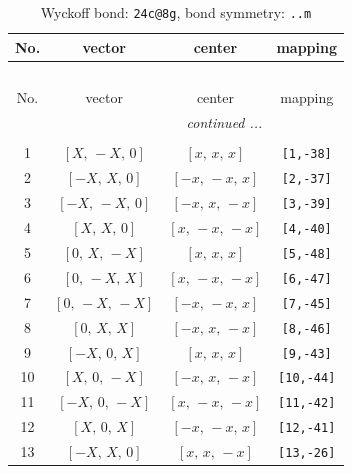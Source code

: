 \documentclass[fleqn,8pt]{jsarticle}
\begin{document}
\begin{longtable}{cccc}
\caption{Wyckoff bond: {\tt 24c@8g}, bond symmetry: {\tt ..m}}
 \\
 \hline \hline
No. & vector & center & mapping \\ \hline \endfirsthead

\multicolumn{3}{l}{\tablename\ \thetable{}} \\
 \hline \hline
No. & vector & center & mapping \\ \hline \endhead

 \hline \hline
\multicolumn{3}{r}{\footnotesize\it continued ...} \\ \endfoot

 \hline \hline
\multicolumn{3}{r}{} \\ \endlastfoot

1 & $\left[ X,\, - X,\, 0 \right]$ & $\left[ x,\, x,\, x \right]$ & {\tt [1,-38]} \\ \hline
2 & $\left[ - X,\, X,\, 0 \right]$ & $\left[ - x,\, - x,\, x \right]$ & {\tt [2,-37]} \\ \hline
3 & $\left[ - X,\, - X,\, 0 \right]$ & $\left[ - x,\, x,\, - x \right]$ & {\tt [3,-39]} \\ \hline
4 & $\left[ X,\, X,\, 0 \right]$ & $\left[ x,\, - x,\, - x \right]$ & {\tt [4,-40]} \\ \hline
5 & $\left[ 0,\, X,\, - X \right]$ & $\left[ x,\, x,\, x \right]$ & {\tt [5,-48]} \\ \hline
6 & $\left[ 0,\, - X,\, X \right]$ & $\left[ x,\, - x,\, - x \right]$ & {\tt [6,-47]} \\ \hline
7 & $\left[ 0,\, - X,\, - X \right]$ & $\left[ - x,\, - x,\, x \right]$ & {\tt [7,-45]} \\ \hline
8 & $\left[ 0,\, X,\, X \right]$ & $\left[ - x,\, x,\, - x \right]$ & {\tt [8,-46]} \\ \hline
9 & $\left[ - X,\, 0,\, X \right]$ & $\left[ x,\, x,\, x \right]$ & {\tt [9,-43]} \\ \hline
10 & $\left[ X,\, 0,\, - X \right]$ & $\left[ - x,\, x,\, - x \right]$ & {\tt [10,-44]} \\ \hline
11 & $\left[ - X,\, 0,\, - X \right]$ & $\left[ x,\, - x,\, - x \right]$ & {\tt [11,-42]} \\ \hline
12 & $\left[ X,\, 0,\, X \right]$ & $\left[ - x,\, - x,\, x \right]$ & {\tt [12,-41]} \\ \hline
13 & $\left[ - X,\, X,\, 0 \right]$ & $\left[ x,\, x,\, - x \right]$ & {\tt [13,-26]} \\ \hline

\end{longtable}
\end{document}
